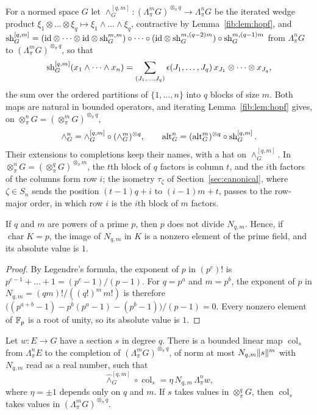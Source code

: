For a normed space $G$ let $\wedge^{[q,m]}_G\colon(\Lambda^m_\pi G)^{\otimes_\pi q}\to\Lambda^n_\pi G$ be the iterated
wedge product $\xi_1\otimes\dots\otimes\xi_q\mapsto\xi_1\wedge\dots\wedge\xi_q$, contractive by Lemma~\ref{fib:lem:hopf},
and $\operatorname{sh}^{[q,m]}_G=(\mathrm{id}\otimes\dots\otimes\mathrm{id}\otimes\operatorname{sh}^{m,m}_G)\circ\dots\circ(\mathrm{id}\otimes\operatorname{sh}^{m,(q-2)m}_G)\circ
\operatorname{sh}^{m,(q-1)m}_G$ from $\Lambda^n_\pi G$ to $(\Lambda^m_\pi G)^{\otimes_\pi q}$, so that
\[
 \operatorname{sh}^{[q,m]}_G(x_1\wedge\dots\wedge x_n)=\sum_{(J_1,\dots,J_q)}\epsilon(J_1,\dots,J_q)\,x_{J_1}\otimes\dots\otimes x_{J_q},
\]
the sum over the ordered partitions of $\{1,\dots,n\}$ into $q$ blocks of size $m$. Both maps are natural in bounded
operators, and iterating Lemma~\ref{fib:lem:hopf} gives, on $\otimes^n_\pi G=(\otimes^m_\pi G)^{\otimes_\pi q}$,
\begin{equation}\label{dgr:eq:iterated}
 \wedge^n_G=\wedge^{[q,m]}_G\circ(\wedge^m_G)^{\otimes q},\qquad
 \operatorname{alt}^n_G=(\operatorname{alt}^m_G)^{\otimes q}\circ\operatorname{sh}^{[q,m]}_G .
\end{equation}
Their extensions to completions keep their names, with a hat on $\wedge^{[q,m]}_G$. In
$\otimes^n_\pi G=(\otimes^q_\pi G)^{\otimes_\pi m}$, the $t$th block of $q$ factors is column $t$, and the $i$th factors of
the columns form row $i$; the isometry $\tau_\zeta$ of Section~\ref{sec:canonical}, where $\zeta\in S_n$ sends the position
$(t-1)q+i$ to $(i-1)m+t$, passes to the row-major order, in which row $i$ is the $i$th block of $m$ factors.

\begin{lemma}\label{dgr:lem:unit}
If $q$ and $m$ are powers of a prime $p$, then $p$ does not divide $N_{q,m}$. Hence, if $\operatorname{char}K=p$, the
image of $N_{q,m}$ in $K$ is a nonzero element of the prime field, and its absolute value is $1$.
\end{lemma}

\begin{proof}
By Legendre's formula, the exponent of $p$ in $(p^c)!$ is $p^{c-1}+\dots+1=(p^c-1)/(p-1)$. For $q=p^a$ and $m=p^b$, the
exponent of $p$ in $N_{q,m}=(qm)!/((q!)^m\,m!)$ is therefore
$\bigl((p^{a+b}-1)-p^b(p^a-1)-(p^b-1)\bigr)/(p-1)=0$. Every nonzero element of $\mathbb F_p$ is a root of unity, so its
absolute value is $1$.
\end{proof}

\begin{proposition}\label{dgr:prop:s-column}
Let $w\colon E\to G$ have a section $s$ in degree $q$. There is a bounded linear map $\operatorname{col}_s$ from
$\Lambda^n_\pi E$ to the completion of $(\Lambda^m_\pi G)^{\otimes_\pi q}$, of norm at most $N_{q,m}\lVert s\rVert^m$ with
$N_{q,m}$ read as a real number, such that
\[
 \widehat\wedge^{[q,m]}_G\circ\operatorname{col}_s=\eta\,N_{q,m}\,\Lambda^n_\pi w,
\]
where $\eta=\pm1$ depends only on $q$ and $m$. If $s$ takes values in $\otimes^q_\pi G$, then $\operatorname{col}_s$ takes
values in $(\Lambda^m_\pi G)^{\otimes_\pi q}$.
\end{proposition}

